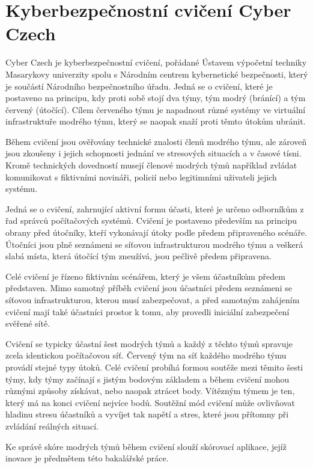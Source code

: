 \documentclass[
  digital, %
  twoside, %
  table,   %
  nolof,     %
  nolot,     %
]{fithesis3}
\begin{document}
\section{Kyberbezpečnostní cvičení Cyber Czech}
Cyber Czech je kyberbezpečnostní cvičení, pořádané Ústavem výpočetní techniky Masarykovy univerzity spolu s Národním centrem kybernetické bezpečnosti, který je součástí Národního bezpečnostního úřadu. Jedná se o cvičení, které je postaveno na principu, kdy proti sobě stojí dva týmy, tým modrý (bránící) a tým červený (útočící). Cílem červeného týmu je napadnout různé systémy ve virtuální infrastruktuře modrého týmu, který se naopak snaží proti těmto útokům ubránit.

Během cvičení jsou ověřovány technické znalosti členů modrého týmu, ale zároveň jsou zkoušeny i jejich schopnosti jednání ve stresových situacích a v časové tísni. Kromě technických dovedností musejí členové modrých týmů například zvládat komunikovat s fiktivními novináři, policií nebo legitimními uživateli jejich systému.

Jedná se o cvičení, zahrnující aktivní formu účasti, které je určeno odborníkům z řad správců počítačových systémů. Cvičení je postaveno především na principu obrany před útočníky, kteří vykonávají útoky podle předem připraveného scénáře. Útočníci jsou plně seznámeni se síťovou infrastrukturou modrého týmu a veškerá slabá místa, která útočící tým zneužívá, jsou pečlivě předem připravena.

Celé cvičení je řízeno fiktivním scénářem, který je všem účastníkům předem představen. Mimo samotný příběh cvičení jsou účastníci předem seznámeni se síťovou infrastrukturou, kterou musí zabezpečovat, a před samotným zahájením cvičení mají také účastníci prostor k tomu, aby provedli iniciální zabezpečení svěřené sítě.

Cvičení se typicky účastní šest modrých týmů a každý z těchto týmů spravuje zcela identickou počítačovou síť. Červený tým na síť každého modrého týmu provádí stejné typy útoků. Celé cvičení probíhá formou soutěže mezi těmito šesti týmy, kdy týmy začínají s jistým bodovým základem a během cvičení mohou různými způsoby získávat, nebo naopak ztrácet body. Vítězným týmem je ten, který má na konci cvičení nejvíce bodů. Soutěžní mód cvičení může ovlivňovat hladinu stresu účastníků a vyvíjet tak napětí a stres, které jsou přítomny při zvládání reálných situací.

Ke správě skóre modrých týmů během cvičení slouží skórovací aplikace, jejíž inovace je předmětem této bakalářské práce. 
\end{document}
